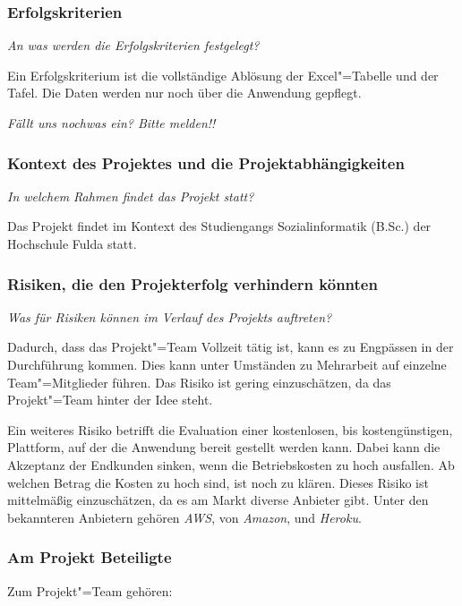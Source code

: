 \subsubsection{Erfolgskriterien}

\textit{An was werden die Erfolgskriterien festgelegt?}

Ein Erfolgskriterium ist die vollständige Ablösung der Excel"=Tabelle und der Tafel. Die Daten werden nur noch über die Anwendung gepflegt.

\textit{Fällt uns nochwas ein? Bitte melden!!}


\subsubsection{Kontext des Projektes und die Projektabhängigkeiten}

\textit{In welchem Rahmen findet das Projekt statt?}

Das Projekt findet im Kontext des Studiengangs Sozialinformatik (B.Sc.) der Hochschule Fulda statt.

\subsubsection{Risiken, die den Projekterfolg verhindern könnten}

\textit{Was für Risiken können im Verlauf des Projekts auftreten?}

Dadurch, dass das Projekt"=Team Vollzeit tätig ist, kann es zu Engpässen in der Durchführung kommen. Dies kann unter Umständen zu Mehrarbeit auf einzelne Team"=Mitglieder führen. Das Risiko ist gering einzuschätzen, da das Projekt"=Team  hinter der Idee steht.

Ein weiteres Risiko betrifft die Evaluation einer kostenlosen, bis kostengünstigen, Plattform, auf der die Anwendung bereit gestellt werden kann. Dabei kann die Akzeptanz der Endkunden sinken, wenn die Betriebskosten zu hoch ausfallen. Ab welchen Betrag die Kosten zu hoch sind, ist noch zu klären. Dieses Risiko ist mittelmäßig einzuschätzen, da es am Markt diverse Anbieter gibt. Unter den bekannteren Anbietern gehören \textit{AWS}, von \textit{Amazon}, und \textit{Heroku}.

\subsubsection{Am Projekt Beteiligte}\label{sec:beteiligte}

Zum Projekt"=Team gehören:

